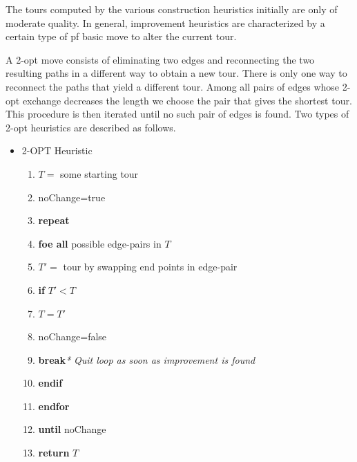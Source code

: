 \documentclass[11pt]{article}
\begin{document}
The tours computed by the various construction heuristics initially are only of moderate quality. In general, improvement heuristics are characterized by a certain type of pf basic move to alter the current tour.

A 2-opt move consists of eliminating two edges and reconnecting the two resulting paths in a different way to obtain a new tour. There is only one way to reconnect the paths that yield a different tour. Among all pairs of edges whose 2-opt exchange decreases the length we choose the pair that gives the shortest tour. This procedure is then iterated until no such pair of edges is found. Two types of 2-opt heuristics are described as follows.



\begin{itemize}
  \item 2-OPT Heuristic
\begin{enumerate}
  \item $T=$ some starting tour
  \item noChange=true
  \item \textbf{repeat}
  \item \quad\textbf{foe all} possible edge-pairs in $T$
  \item \quad\quad $T'=$ tour by swapping end points in edge-pair
  \item \quad\quad\textbf{if} $T'<T$
  \item \quad\quad\quad $T=T'$
  \item \quad\quad\quad noChange=false
  \item \quad\quad\quad\textbf{break}\quad\emph{* Quit loop as soon as improvement is found}
  \item \quad\quad\textbf{endif}
  \item \quad\textbf{endfor}
  \item \textbf{until} noChange
  \item \textbf{return} $T$
\end{enumerate}
\end{itemize}
\end{document}

